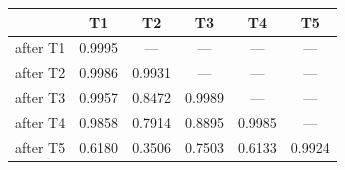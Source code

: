 \begin{tabular}{@{}lccccc@{}}
\toprule
& \textbf{T1} & \textbf{T2} & \textbf{T3} & \textbf{T4} & \textbf{T5} \\
\midrule
after T1 & 0.9995 & --- & --- & --- & --- \\
after T2 & 0.9986 & 0.9931 & --- & --- & --- \\
after T3 & 0.9957 & 0.8472 & 0.9989 & --- & --- \\
after T4 & 0.9858 & 0.7914 & 0.8895 & 0.9985 & --- \\
after T5 & 0.6180 & 0.3506 & 0.7503 & 0.6133 & 0.9924 \\
\bottomrule
\end{tabular}

